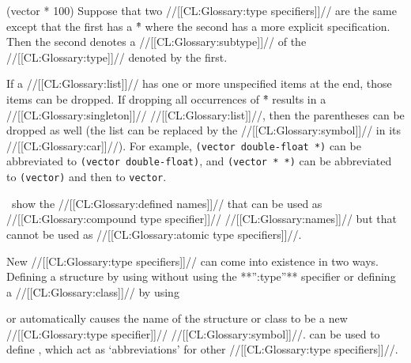 \code
 (vector * 100)                                       \endcode Suppose that two //[[CL:Glossary:type specifiers]]// are the same except that the first has a \f{*} where the second has a more explicit specification. Then the second denotes a //[[CL:Glossary:subtype]]//  of the //[[CL:Glossary:type]]// denoted by the first.

If a //[[CL:Glossary:list]]// has one or more unspecified items at the end,  those items can be dropped. If dropping all occurrences of \f{*} results in a //[[CL:Glossary:singleton]]// //[[CL:Glossary:list]]//, then the parentheses can be dropped as well (the list can be replaced by the //[[CL:Glossary:symbol]]// in its //[[CL:Glossary:car]]//).   For example,                        {\tt (vector double-float *)}                     can be abbreviated to {\tt (vector double-float)},                and {\tt (vector * *)} can be abbreviated to {\tt (vector)}  and then to  {\tt vector}.


 

\Thenextfigure\ show the //[[CL:Glossary:defined names]]// that can be used as  //[[CL:Glossary:compound type specifier]]// //[[CL:Glossary:names]]// but that cannot be used as //[[CL:Glossary:atomic type specifiers]]//.


New //[[CL:Glossary:type specifiers]]// can come into existence in two ways. \beginlist \itemitem{\bull} 
 Defining a structure by using  without using
 the **'':type''** specifier or defining a //[[CL:Glossary:class]]// by using 

 or 
 automatically causes the name of the structure 
 or class to be a new //[[CL:Glossary:type specifier]]// //[[CL:Glossary:symbol]]//. \itemitem{\bull} 
  can be used to define ,
 which act as `abbreviations' for other //[[CL:Glossary:type specifiers]]//. \endlist

